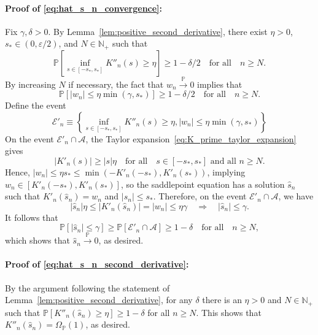 \documentclass[12pt]{article}
\theoremstyle{definition}
\def\P{\mathbb{P}}
\def\P{\mathbb{P}}
\renewcommand{\P}{\mathbb{P}}							%
\newcommand{\convp}{\overset{\mathbb{P}}{\rightarrow}}             %
\begin{document}
\paragraph{Proof of \eqref{eq:hat_s_n_convergence}:}

Fix $\gamma, \delta > 0$. By Lemma~\ref{lem:positive_second_derivative}, there exist $\eta > 0$, $s_* \in (0, \varepsilon/2)$, and $N \in \mathbb N_+$ such that
\begin{equation*}
\P\left[\inf_{s \in [-s_*, s_*]} K''_n(s) \geq \eta\right] \geq 1 - \delta/2 \quad \text{for all} \quad n \geq N.
\end{equation*}
By increasing $N$ if necessary, the fact that $w_n \convp 0$ implies that
\begin{equation*}
\P[|w_n| \leq \eta \min(\gamma, s_*)] \geq 1 - \delta/2  \quad \text{for all} \quad n \geq N.
\end{equation*}
Define the event 
\begin{equation*}
\mathcal E'_n \equiv \left\{\inf_{s \in [-s_*, s_*]} K''_n(s) \geq \eta, |w_n| \leq \eta \min(\gamma, s_*)\right\}
\end{equation*}
On the event $\mathcal E'_n \cap \mathcal A$, the Taylor expansion~\eqref{eq:K_prime_taylor_expansion} gives
\begin{equation*}
|K'_n(s)| \geq |s| \eta \quad \text{for all} \quad s \in [-s_*, s_*] \text{ and all } n \geq N.
\end{equation*}  
Hence, $|w_n| \leq \eta s_* \leq \min(-K'_n(-s_*), K'_n(s_*))$, implying $w_n \in [K'_n(-s_*), K'_n(s_*)]$, so the saddlepoint equation has a solution $\hat s_n$ such that $K'_n(\hat s_n) = w_n$ and $|\hat s_n| \leq s_*$. Therefore, on the event $\mathcal E'_n \cap \mathcal A$, we have
\begin{equation*}
|\hat s_n| \eta \leq |K'_n(\hat s_n)| = |w_n| \leq \eta \gamma\quad \Longrightarrow\quad |\hat s_n| \leq \gamma.
\end{equation*}
It follows that
\begin{equation*}
\P[|\hat s_n| \leq \gamma] \geq \P[\mathcal E'_n \cap \mathcal A] \geq 1 - \delta \quad \text{for all} \quad n \geq N,
\end{equation*}
which shows that $\hat s_n \convp 0$, as desired.

\paragraph{Proof of \eqref{eq:hat_s_n_second_derivative}:} By the argument following the statement of Lemma~\ref{lem:positive_second_derivative}, for any $\delta$ there is an $\eta > 0$ and $N \in \mathbb N_+$ such that $\P[K''_n(\hat s_n) \geq \eta] \geq 1-\delta$ for all $n \geq N$. This shows that $K''_n(\hat s_n) = \Omega_{\P}(1)$, as desired. 
\end{document}
